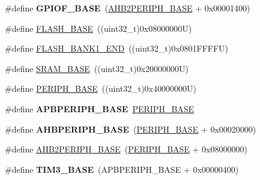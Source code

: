 \begin{DoxyCompactItemize}
\#define {\bfseries G\+P\+I\+O\+F\+\_\+\+B\+A\+SE}~(\hyperlink{group___peripheral__memory__map_gaeedaa71d22a1948492365e2cd26cfd46}{A\+H\+B2\+P\+E\+R\+I\+P\+H\+\_\+\+B\+A\+SE} + 0x00001400)
\item 
\#define \hyperlink{group___peripheral__memory__map_ga23a9099a5f8fc9c6e253c0eecb2be8db}{F\+L\+A\+S\+H\+\_\+\+B\+A\+SE}~((uint32\+\_\+t)0x08000000\+U)
\item 
\#define \hyperlink{group___peripheral__memory__map_ga443a2786535d83e32dfdc2b29e379332}{F\+L\+A\+S\+H\+\_\+\+B\+A\+N\+K1\+\_\+\+E\+ND}~((uint32\+\_\+t)0x0801\+F\+F\+F\+F\+U)
\item 
\#define \hyperlink{group___peripheral__memory__map_ga05e8f3d2e5868754a7cd88614955aecc}{S\+R\+A\+M\+\_\+\+B\+A\+SE}~((uint32\+\_\+t)0x20000000\+U)
\item 
\#define \hyperlink{group___peripheral__memory__map_ga9171f49478fa86d932f89e78e73b88b0}{P\+E\+R\+I\+P\+H\+\_\+\+B\+A\+SE}~((uint32\+\_\+t)0x40000000\+U)
\item 
\mbox{\label{group___peripheral__memory__map_gac85f31889eb6a3f651b563bbc7131f91}} 
\#define {\bfseries A\+P\+B\+P\+E\+R\+I\+P\+H\+\_\+\+B\+A\+SE}~\hyperlink{group___peripheral__memory__map_ga9171f49478fa86d932f89e78e73b88b0}{P\+E\+R\+I\+P\+H\+\_\+\+B\+A\+SE}
\item 
\mbox{\label{group___peripheral__memory__map_ga92eb5d49730765d2abd0f5b09548f9f5}} 
\#define {\bfseries A\+H\+B\+P\+E\+R\+I\+P\+H\+\_\+\+B\+A\+SE}~(\hyperlink{group___peripheral__memory__map_ga9171f49478fa86d932f89e78e73b88b0}{P\+E\+R\+I\+P\+H\+\_\+\+B\+A\+SE} + 0x00020000)
\item 
\#define \hyperlink{group___peripheral__memory__map_gaeedaa71d22a1948492365e2cd26cfd46}{A\+H\+B2\+P\+E\+R\+I\+P\+H\+\_\+\+B\+A\+SE}~(\hyperlink{group___peripheral__memory__map_ga9171f49478fa86d932f89e78e73b88b0}{P\+E\+R\+I\+P\+H\+\_\+\+B\+A\+SE} + 0x08000000)
\item 
\mbox{\label{group___peripheral__memory__map_gaf0c34a518f87e1e505cd2332e989564a}} 
\#define {\bfseries T\+I\+M3\+\_\+\+B\+A\+SE}~(A\+P\+B\+P\+E\+R\+I\+P\+H\+\_\+\+B\+A\+SE + 0x00000400)
\item 
\mbox{\label{group___peripheral__memory__map_ga8268ec947929f192559f28c6bf7d1eac}} 

\end{DoxyCompactItemize}

